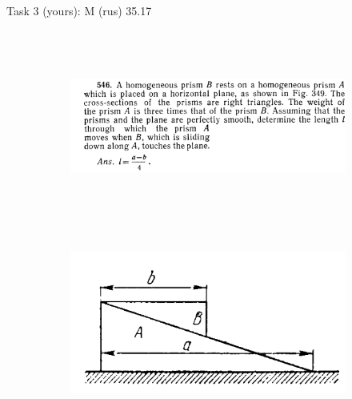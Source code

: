\documentclass[aspectratio=169]{beamer}
\begin{document}
    \begin{frame}[t]{Task 3 (yours): M (rus) 35.17}
    \framesubtitle{}
        \begin{figure}[H]
            \flushleft
            \begin{subfigure}{0.59\textwidth}
                \includegraphics[height=6cm,width=1\textwidth,keepaspectratio]{image10.png}
            \end{subfigure}
            \begin{subfigure}{0.39\textwidth}
                \centering\includegraphics[height=6cm,width=1\textwidth,keepaspectratio]{image9.png}
                \label{fig:image9}
            \end{subfigure}
        \end{figure}
    \end{frame}
    
\end{document}
